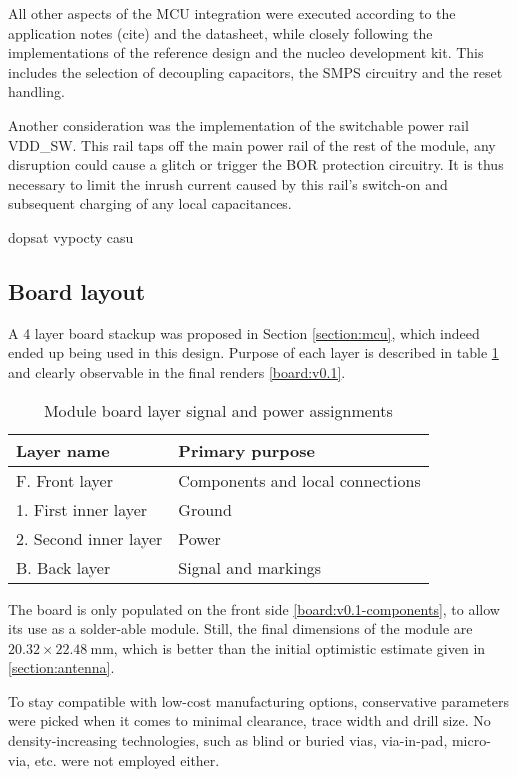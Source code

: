 All other aspects of the MCU integration were executed according to the application notes (cite) and the datasheet, while closely following the implementations of the reference design and the nucleo development kit. This includes the selection of decoupling capacitors, the SMPS circuitry and the reset handling.

Another consideration was the implementation of the switchable power rail VDD\_SW. This rail taps off the main power rail of the rest of the module, any disruption could cause a glitch or trigger the BOR protection circuitry. It is thus necessary to limit the inrush current caused by this rail's switch-on and subsequent charging of any local capacitances.

dopsat vypocty casu

\subsection{Board layout}
A 4 layer board stackup was proposed in Section \ref{section:mcu}, which indeed ended up being used in this design. Purpose of each layer is described in table \ref{table:board-layers} and clearly observable in the final renders \ref{board:v0.1}.

\begin{table}[H]
\begin{center}
\caption{\label{table:board-layers}Module board layer signal and power assignments}
    \begin{tabular}{|l|l|} \hline
    \textbf{Layer name}     & \textbf{Primary purpose} \\ \hline
    F. Front layer          & Components and local connections \\ \hline
    1. First inner layer    & Ground \\ \hline
    2. Second inner layer   & Power \\ \hline
    B. Back layer           & Signal and markings \\ \hline
    \end{tabular}
\end{center}
\end{table}

The board is only populated on the front side \ref{board:v0.1-components}, to allow its use as a solder-able module. Still, the final dimensions of the module are $20.32 \times 22.48~\mathrm{mm}$, which is better than the initial optimistic estimate given in \ref{section:antenna}.

To stay compatible with low-cost manufacturing options, conservative parameters were picked when it comes to minimal clearance, trace width and drill size. No density-increasing technologies, such as blind or buried vias, via-in-pad, micro-via, etc. were not employed either. 

